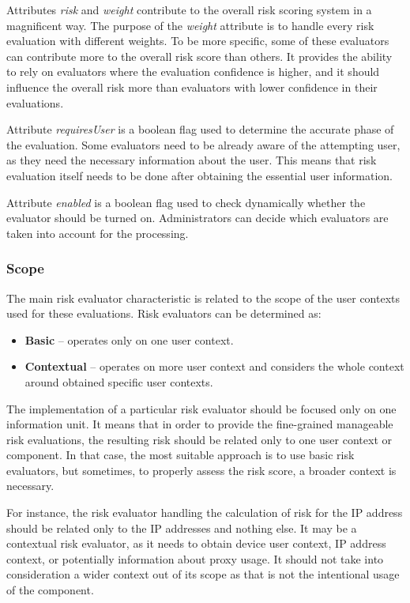 Attributes \textit{risk} and \textit{weight} contribute to the overall risk scoring system in a magnificent way.
The purpose of the \textit{weight} attribute is to handle every risk evaluation with different weights.
To be more specific, some of these evaluators can contribute more to the overall risk score than others.
It provides the ability to rely on evaluators where the evaluation confidence is higher, and it should influence the overall risk more than evaluators with lower confidence in their evaluations.

Attribute \textit{requiresUser} is a boolean flag used to determine the accurate phase of the evaluation.
Some evaluators need to be already aware of the attempting user, as they need the necessary information about the user.
This means that risk evaluation itself needs to be done after obtaining the essential user information.

Attribute \textit{enabled} is a boolean flag used to check dynamically whether
the evaluator should be turned on.
Administrators can decide which evaluators are taken into account for the processing.

\subsubsection{Scope}
The main risk evaluator characteristic is related to the scope of the user contexts used for these evaluations.
\newline
\newline
Risk evaluators can be determined as:

\begin{itemize}
    \item \textbf{Basic} -- operates only on one user context.
    \item \textbf{Contextual} -- operates on more user context and considers the whole context around obtained specific user contexts.
\end{itemize}

The implementation of a particular risk evaluator should be focused only on one information unit.
It means that in order to provide the fine-grained manageable risk evaluations, the resulting risk should be related only to one user context or component.
In that case, the most suitable approach is to use basic risk evaluators, but sometimes, to properly assess the risk score, a broader context is necessary.

For instance, the risk evaluator handling the calculation of risk for the IP address should be related only to the IP addresses and nothing else.
It may be a contextual risk evaluator, as it needs to obtain device user context, IP address context, or potentially information about proxy usage.
It should not take into consideration a wider context out of its scope as that is not the intentional usage of the component.

